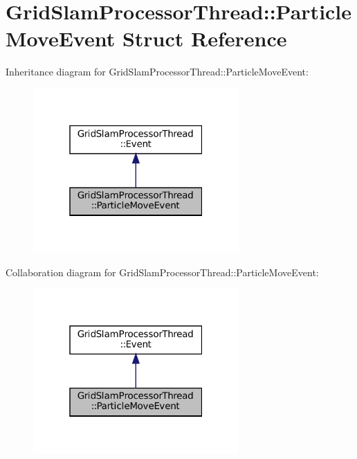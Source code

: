 \hypertarget{structGridSlamProcessorThread_1_1ParticleMoveEvent}{}\section{Grid\+Slam\+Processor\+Thread\+:\+:Particle\+Move\+Event Struct Reference}
\label{structGridSlamProcessorThread_1_1ParticleMoveEvent}


Inheritance diagram for Grid\+Slam\+Processor\+Thread\+:\+:Particle\+Move\+Event\+:
\nopagebreak
\begin{figure}[H]
\begin{center}
\leavevmode
\includegraphics[width=223pt]{structGridSlamProcessorThread_1_1ParticleMoveEvent__inherit__graph}
\end{center}
\end{figure}


Collaboration diagram for Grid\+Slam\+Processor\+Thread\+:\+:Particle\+Move\+Event\+:
\nopagebreak
\begin{figure}[H]
\begin{center}
\leavevmode
\includegraphics[width=223pt]{structGridSlamProcessorThread_1_1ParticleMoveEvent__coll__graph}
\end{center}
\end{figure}
